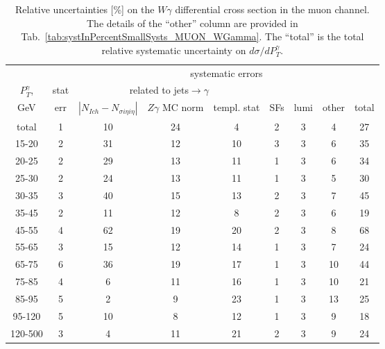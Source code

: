 \begin{table}[h]
  \scriptsize
  \begin{center}
  \caption{Relative uncertainties [\%] on the $W\gamma$ differential cross section in the muon channel. The details of the ``other'' column are provided in Tab.~\ref{tab:systInPercentSmallSysts_MUON_WGamma}. The ``total'' is the total relative systematic uncertainty on $d\sigma/dP_T^{\gamma}$.}
   \begin{tabular}{|c|c|c|c|c|c|c|c|c|}
   \hline
                   &     & \multicolumn{7}{|c|}{systematic errors}     \\
    $P_T^{\gamma}$,  & stat & \multicolumn{3}{|c|}{related to jets$\rightarrow\gamma$}              &  &  &  & \\
    GeV           & err & $|N_{Ich}-N_{\sigma{i\eta i\eta}}|$ &$Z\gamma$ MC norm         &templ. stat  & SFs & lumi & other & total\\ \hline
    total  & 1 & 10 & 24 & 4 & 2 & 3 & 4 & 27 \\ \hline
    15-20 & 2 & 31 & 12 & 10 & 3 & 3 & 6 & 35 \\ \hline
    20-25 & 2 & 29 & 13 & 11 & 1 & 3 & 6 & 34 \\ \hline
    25-30 & 2 & 24 & 13 & 11 & 1 & 3 & 5 & 30 \\ \hline
    30-35 & 3 & 40 & 15 & 13 & 2 & 3 & 7 & 45 \\ \hline
    35-45 & 2 & 11 & 12 & 8 & 2 & 3 & 6 & 19 \\ \hline
    45-55 & 4 & 62 & 19 & 20 & 2 & 3 & 8 & 68 \\ \hline
    55-65 & 3 & 15 & 12 & 14 & 1 & 3 & 7 & 24 \\ \hline
    65-75 & 6 & 36 & 19 & 17 & 1 & 3 & 10 & 44 \\ \hline
    75-85 & 4 & 6 & 11 & 16 & 1 & 3 & 10 & 21 \\ \hline
    85-95 & 5 & 2 & 9 & 23 & 1 & 3 & 13 & 25 \\ \hline
    95-120 & 5 & 10 & 8 & 12 & 1 & 3 & 9 & 18 \\ \hline
    120-500 & 3 & 4 & 11 & 21 & 2 & 3 & 9 & 24 \\ \hline
  \end{tabular}
  \label{tab:systInPercent_MUON_WGamma}
  \end{center}
\end{table}

